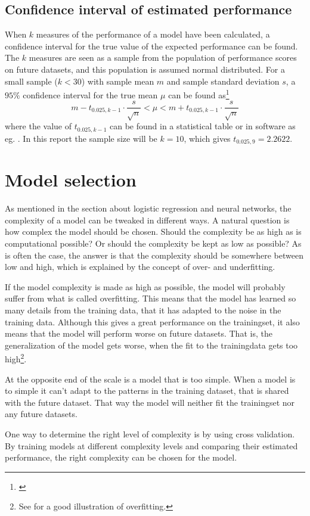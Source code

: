 \subsection{Confidence interval of estimated performance}\label{sec:statistics-on-performance}
When $k$ measures of the performance of a model have been calculated, a confidence interval for the true value of the expected performance can be found. The $k$ measures are seen as a sample from the population of performance scores on future datasets, and this population is assumed normal distributed. For a small sample ($k<30$) with sample mean $m$ and sample standard deviation $s$, a $95\%$ confidence interval for the true mean $\mu$ can be found as\footnote{\citet[p.232-233]{johnson05}}
\[
    m-t_{0.025,k-1}\cdot\frac{s}{\sqrt{n}} < \mu < m+t_{0.025,k-1}\cdot\frac{s}{\sqrt{n}}
\]
where the value of $t_{0.025,k-1}$ can be found in a statistical table or in software as eg. . In this report the sample size will be $k=10$, which gives $t_{0.025,9}=2.2622$.

\section{Model selection}
As mentioned in the section about logistic regression and neural networks, the complexity of a model can be tweaked in different ways. A natural question is how complex the model should be chosen. Should the complexity be as high as is computational possible? Or should the complexity be kept as low as possible? As is often the case, the answer is that the complexity should be somewhere between low and high, which is explained by the concept of over- and underfitting. \par
If the model complexity is made as high as possible, the model will probably suffer from what is called overfitting. This means that the model has learned so many details from the training data, that it has adapted to the noise in the training data. Although this gives a great performance on the trainingset, it also means that the model will perform worse on future datasets. That is, the generalization of the model gets worse, when the fit to the trainingdata gets too high\footnote{See \citet[p.220]{hastie09} for a good illustration of overfitting.}. \par
At the opposite end of the scale is a model that is too simple. When a model is to simple it can't adapt to the patterns in the training dataset, that is shared with the future dataset. That way the model will neither fit the trainingset nor any future datasets. \par
One way to determine the right level of complexity is by using cross validation. By training models at different complexity levels and comparing their estimated performance, the right complexity can be chosen for the model.

